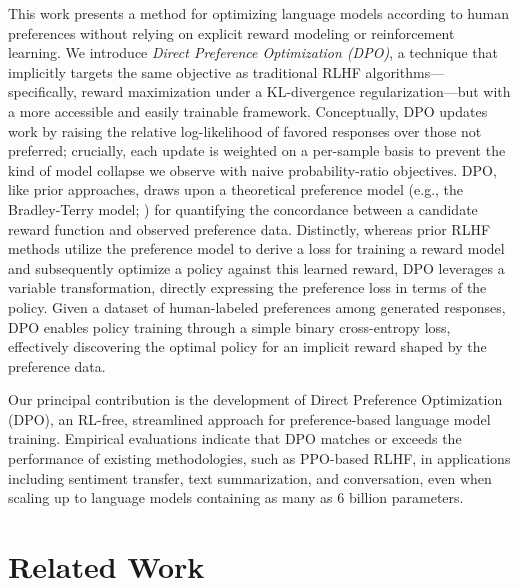 This work presents a method for optimizing language models according to human preferences without relying on explicit reward modeling or reinforcement learning. We introduce \textit{{Direct Preference Optimization} (DPO)}, a technique that implicitly targets the same objective as traditional RLHF algorithms—specifically, reward maximization under a KL-divergence regularization—but with a more accessible and easily trainable framework. Conceptually, DPO updates work by raising the relative log-likelihood of favored responses over those not preferred; crucially, each update is weighted on a per-sample basis to prevent the kind of model collapse we observe with naive probability-ratio objectives. DPO, like prior approaches, draws upon a theoretical preference model (e.g., the Bradley-Terry model; \cite{bradley1952rankanalysis}) for quantifying the concordance between a candidate reward function and observed preference data. Distinctly, whereas prior RLHF methods utilize the preference model to derive a loss for training a reward model and subsequently optimize a policy against this learned reward, DPO leverages a variable transformation, directly expressing the preference loss in terms of the policy. Given a dataset of human-labeled preferences among generated responses, DPO enables policy training through a simple binary cross-entropy loss, effectively discovering the optimal policy for an implicit reward shaped by the preference data.

Our principal contribution is the development of Direct Preference Optimization (DPO), an RL-free, streamlined approach for preference-based language model training. Empirical evaluations indicate that DPO matches or exceeds the performance of existing methodologies, such as PPO-based RLHF, in applications including sentiment transfer, text summarization, and conversation, even when scaling up to language models containing as many as 6 billion parameters.

\section{Related Work}

